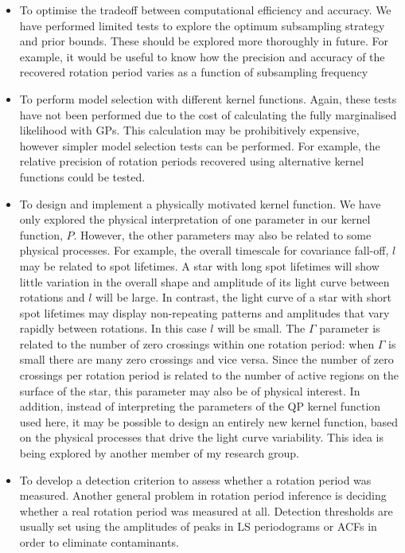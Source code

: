 \documentclass[useAMS, usenatbib, preprint, 12pt]{aastex}
\begin{document}
\begin{itemize}
\item{To optimise the tradeoff between computational efficiency and accuracy.
We have performed limited tests to explore the optimum subsampling strategy
and prior bounds.
These should be explored more thoroughly in future.
For example, it would be useful to know how the precision and accuracy of the
recovered rotation period varies as a function of subsampling frequency}
\item{To perform model selection with different kernel functions. Again, these
tests have not been performed due to the cost of calculating the fully
marginalised likelihood with GPs. This calculation may be prohibitively
expensive, however simpler model selection tests can be performed. For
example, the relative precision of rotation periods recovered using
alternative kernel functions could be tested.}
\item{To design and implement a physically motivated kernel function. We have
only explored the physical interpretation of one parameter in our kernel
function, $P$.
However, the other parameters may also be related to some physical processes.
For example, the overall timescale for covariance fall-off, $l$ may be
related to spot lifetimes.
A star with long spot lifetimes will show little variation in the overall
shape and amplitude of its light curve between rotations and $l$ will be
large.
In contrast, the light curve of a star with short spot lifetimes may display
non-repeating patterns and amplitudes that vary rapidly between rotations.
In this case $l$ will be small.
The $\Gamma$ parameter is related to the number of zero crossings within one
rotation period: when $\Gamma$ is small there are many zero crossings and
vice versa.
Since the number of zero crossings per rotation period is related to the
number of active regions on the surface of the star, this parameter may also
be of physical interest.
In addition, instead of interpreting the parameters of the QP kernel function
used here, it may be possible to design an entirely new kernel function, based
on the physical processes that drive the light curve variability.
This idea is being explored by another member of my research group.}
\item{To develop a detection criterion to assess whether a rotation period was
measured.
Another general problem in rotation period inference is deciding whether a
real rotation period was measured at all.
Detection thresholds are usually set using the amplitudes of peaks in LS
periodograms or ACFs in order to eliminate contaminants.
}
\end{itemize}
\end{document}
